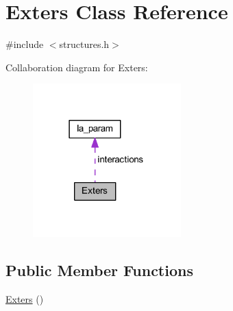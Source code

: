 \hypertarget{class_exters}{\section{Exters Class Reference}
\label{class_exters}
}


{\ttfamily \#include $<$structures.\+h$>$}



Collaboration diagram for Exters\+:\nopagebreak
\begin{figure}[H]
\begin{center}
\leavevmode
\includegraphics[width=162pt]{class_exters__coll__graph}
\end{center}
\end{figure}
\subsection*{Public Member Functions}
\begin{DoxyCompactItemize}
\item 
\hyperlink{class_exters_a36dd0bbb6aab1778f243d12e61aa0ad9}{Exters} ()
\end{DoxyCompactItemize}
